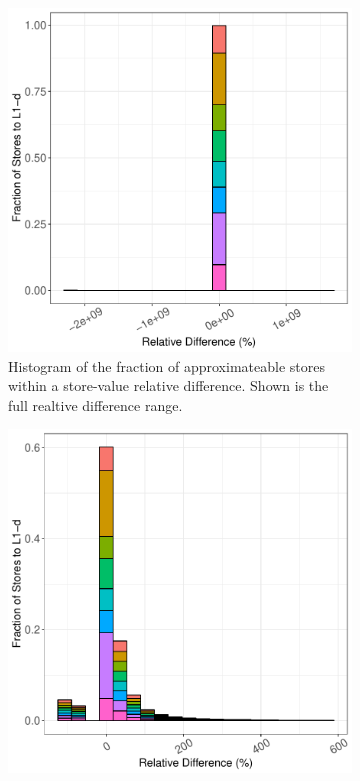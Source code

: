 \begin{figure}[htbp]
	\begin{subfigure}{0.33\textwidth}
		\centering
		\includegraphics[scale=0.4]{graphs/matrix_multiply/full_hist.pdf}
		\caption{Histogram of the fraction of approximateable stores within a store-value relative difference. Shown is the full realtive difference range.}
	\end{subfigure}
	\begin{subfigure}{0.33\textwidth}
		\centering
		\includegraphics[scale=0.4]{graphs/matrix_multiply/narrow_hist.pdf}

\end{subfigure}
\end{figure}
